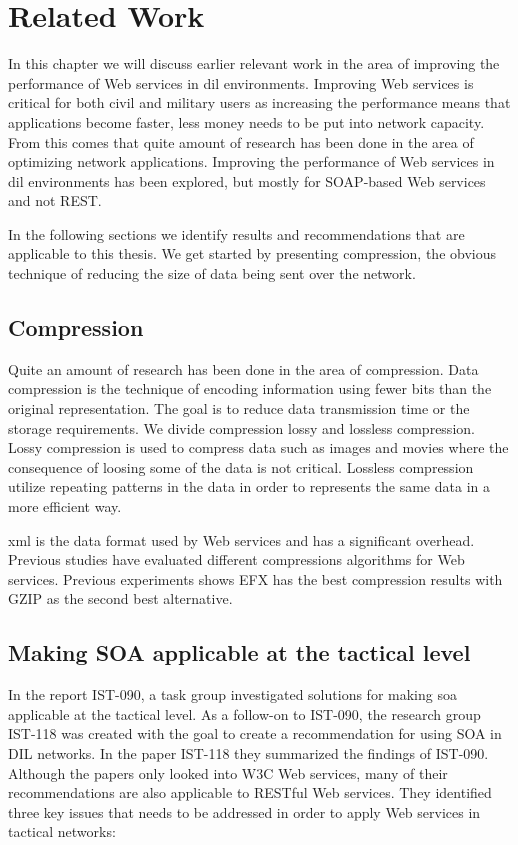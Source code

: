 \chapter{Related Work}

In this chapter we will discuss earlier relevant work in the area of improving
the performance of Web services in \gls{dil} environments. Improving Web
services is critical for both civil and military users as increasing the
performance means that applications become faster, less money needs to be put
into network capacity. From this comes that quite amount of research has been
done in the area of optimizing network applications. Improving the performance
of Web services in \gls{dil} environments has been explored, but mostly for
SOAP-based Web services and not REST.

In the following sections we identify results and recommendations that are
applicable to this thesis. We get started by presenting compression, the obvious
technique of reducing the size of data being sent over the network.


\section{Compression}
Quite an amount of research has been done in the area of compression. Data compression is the technique of encoding information using fewer bits than
the original representation. The goal is to reduce data transmission time or the
storage requirements. We divide compression lossy and lossless compression.
Lossy compression is used to compress data such as images and movies where the
consequence of loosing some of the data is not critical. Lossless compression
utilize repeating patterns in the  data in order to represents the same data in
a more efficient way.

\gls{xml} is the data format used by Web services and has a significant
overhead. Previous studies have evaluated different compressions algorithms for
Web services. Previous experiments shows EFX has the best compression results with
GZIP as the second best alternative\cite{johnsen-trude-compression-techniqes}.


\section{Making SOA applicable at the tactical level}

In the report IST-090, a task group investigated solutions for making \gls{soa}
applicable at the tactical level. As a follow-on to IST-090, the research group
IST-118 was created with the goal to create a recommendation for using SOA in
DIL networks. In the paper IST-118\cite{ist-118} they summarized the findings of
IST-090. Although the papers only looked into W3C Web services, many of their
recommendations are also applicable to RESTful Web services. They identified
three key issues that needs to be addressed in order to apply Web services in
tactical networks\cite{ist-090, ist-118}:

